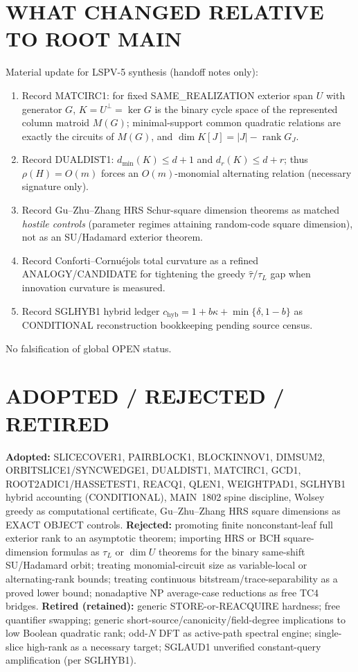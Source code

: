 \documentclass[11pt]{article}
\begin{document}
\section*{WHAT CHANGED RELATIVE TO ROOT MAIN}
Material update for LSPV-5 synthesis (handoff notes only):
\begin{enumerate}
\item Record MATCIRC1: for fixed SAME\_REALIZATION exterior span $U$ with generator $G$,
$K=U^\perp=\ker G$ is the binary cycle space of the represented column matroid $M(G)$;
minimal-support common quadratic relations are exactly the circuits of $M(G)$, and
$\dim K[J]=|J|-\operatorname{rank}G_J$.
\item Record DUALDIST1: $d_{\min}(K)\le d+1$ and $d_r(K)\le d+r$; thus
$\rho(H)=O(m)$ forces an $O(m)$-monomial alternating relation (necessary signature only).
\item Record Gu--Zhu--Zhang HRS Schur-square dimension theorems as matched
\textit{hostile controls} (parameter regimes attaining random-code square dimension),
not as an SU/Hadamard exterior theorem.
\item Record Conforti--Cornu\'ejols total curvature as a refined ANALOGY/CANDIDATE for
tightening the greedy $\widehat\tau/\tau_L$ gap when innovation curvature is measured.
\item Record SGLHYB1 hybrid ledger $c_{\mathrm{hyb}}=1+b\kappa+\min\{\delta,1-b\}$ as CONDITIONAL
reconstruction bookkeeping pending source census.
\end{enumerate}
No falsification of global OPEN status.

\section*{ADOPTED / REJECTED / RETIRED}
\textbf{Adopted:} SLICECOVER1, PAIRBLOCK1, BLOCKINNOV1, DIMSUM2, ORBITSLICE1/SYNCWEDGE1,
DUALDIST1, MATCIRC1, GCD1, ROOT2ADIC1/HASSETEST1, REACQ1, QLEN1, WEIGHTPAD1, SGLHYB1
hybrid accounting (CONDITIONAL), MAIN~1802 spine discipline, Wolsey greedy as computational
certificate, Gu--Zhu--Zhang HRS square dimensions as EXACT OBJECT controls.
\textbf{Rejected:} promoting finite nonconstant-leaf full exterior rank to an asymptotic theorem;
importing HRS or BCH square-dimension formulas as $\tau_L$ or $\dim U$ theorems for the binary
same-shift SU/Hadamard orbit; treating monomial-circuit size as variable-local or alternating-rank
bounds; treating continuous bitstream/trace-separability as a proved lower bound;
nonadaptive NP average-case reductions as free TC4 bridges.
\textbf{Retired (retained):} generic STORE-or-REACQUIRE hardness; free quantifier swapping;
generic short-source/canonicity/field-degree implications to low Boolean quadratic rank;
odd-$N$ DFT as active-path spectral engine; single-slice high-rank as a necessary target;
SGLAUD1 unverified constant-query amplification (per SGLHYB1).
\end{document}
